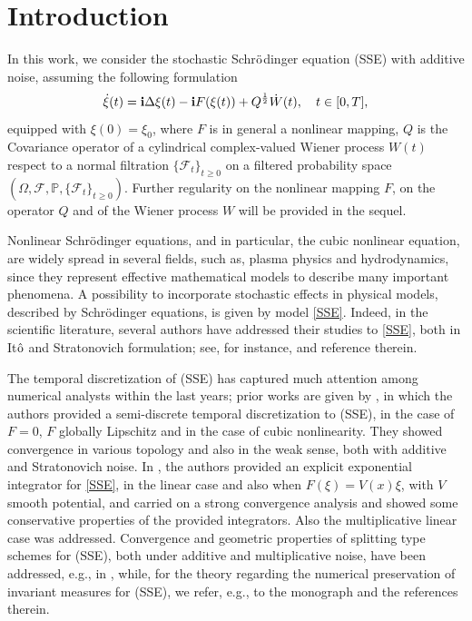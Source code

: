 \documentclass[a4paper]{amsart}
\begin{document}
\section{Introduction}
In this work, we consider the stochastic Schr$\ddot{\rm o}$dinger equation (SSE) with additive noise, assuming the following formulation
\begin{equation}
    \label{SSE}
    \dot{\xi}(t)={\bf i}\Delta \xi(t)-{\bf i}F(\xi(t))+Q^{\frac{1}{2}}\dot{W}(t), \quad t\in[0,T],
\end{equation}
equipped with $\xi(0)=\xi_0$, where $F$ is in general a nonlinear mapping, $Q$ is the Covariance operator of a cylindrical complex-valued Wiener process $W(t)$ respect to a normal filtration $\{\mathcal{F}_t\}_{t\ge 0}$ on a filtered probability space 
$\left(\Omega, \mathcal{F}, \mathbb{P}, \{\mathcal{F}_t\}_{t\ge 0}\right)$. Further regularity on the nonlinear mapping $F$, on the operator $Q$ and of the Wiener process $W$ will be provided in the sequel.  

Nonlinear Schrödinger equations, and in particular, the cubic nonlinear equation, are widely spread in several fields, such as, plasma physics and hydrodynamics, since they represent effective mathematical models to describe many important phenomena. A possibility to incorporate stochastic effects in  physical models, described by Schrödinger equations, is given by model \eqref{SSE}. Indeed, in the scientific literature, several authors have addressed their studies to \eqref{SSE}, both in It$\hat{\rm o}$ and Stratonovich formulation; see, for instance, \cite{deb3,deb2,deb4, deb0,deb5,cui2,mora,hong,hong_wang} and reference therein.

The temporal discretization of (SSE) has captured much attention among numerical analysts within the last years; prior works are given by \cite{deb7,deb0}, in which the authors provided a semi-discrete temporal discretization to (SSE), in the case of $F=0$, $F$ globally Lipschitz and in the case of cubic nonlinearity. They showed convergence in various topology and also in the weak sense, both with additive and Stratonovich noise. In \cite{an_co}, the authors provided an explicit exponential integrator for \eqref{SSE}, in the linear case and also when $F(\xi)=V(x)\xi$, with $V$ smooth potential, and carried on a strong convergence analysis and showed some conservative properties of the provided integrators. Also the multiplicative linear case was addressed. Convergence and geometric properties of splitting type schemes for (SSE), both under additive and multiplicative noise, have been addressed, e.g., in \cite{bre-co,cui,jia,liu,liu2,hong,hong_wang}, while, for the theory regarding the numerical preservation of invariant measures for (SSE), we refer, e.g., to the monograph \cite{hong_wang} and the references therein.
\end{document}
